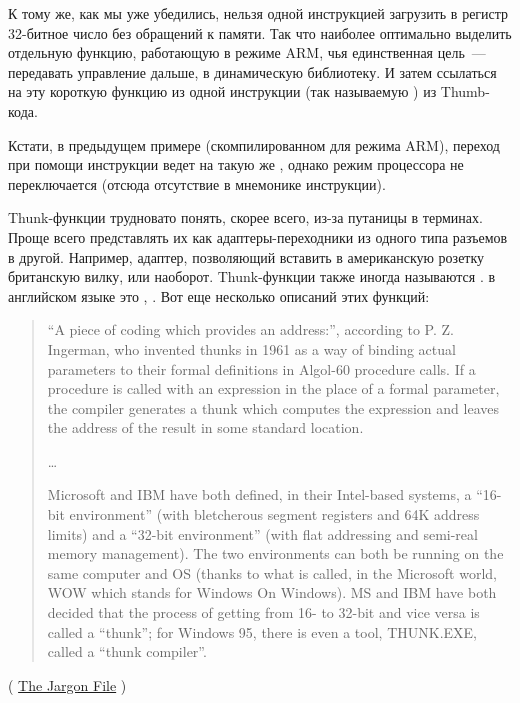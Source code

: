 К тому же, как мы уже убедились, нельзя одной инструкцией загрузить в регистр 32-битное число без обращений к памяти.
Так что наиболее оптимально выделить отдельную функцию, работающую в режиме ARM, 
чья единственная цель~--- передавать управление дальше, в динамическую библиотеку.
И затем ссылаться на эту короткую функцию из одной инструкции (так называемую ) из Thumb-кода.

Кстати, в предыдущем примере (скомпилированном для режима ARM), переход при помощи инструкции  ведет 
на такую же , однако режим процессора не переключается (отсюда отсутствие  в мнемонике инструкции).


Thunk-функции трудновато понять, скорее всего, из-за путаницы в терминах.
Проще всего представлять их как адаптеры-переходники из одного типа разъемов в другой.
Например, адаптер, позволяющий вставить в американскую розетку британскую вилку, или наоборот.
Thunk-функции также иногда называются .  в английском языке это , .
Вот еще несколько описаний этих функций:

\begin{framed}
\begin{quotation}
“A piece of coding which provides an address:”, according to P. Z. Ingerman, 
who invented thunks in 1961 as a way of binding actual parameters to their formal 
definitions in Algol-60 procedure calls. If a procedure is called with an expression 
in the place of a formal parameter, the compiler generates a thunk which computes 
the expression and leaves the address of the result in some standard location.

\dots

Microsoft and IBM have both defined, in their Intel-based systems, a “16-bit environment” 
(with bletcherous segment registers and 64K address limits) and a “32-bit environment” 
(with flat addressing and semi-real memory management). The two environments can both be 
running on the same computer and OS (thanks to what is called, in the Microsoft world, 
WOW which stands for Windows On Windows). MS and IBM have both decided that the process 
of getting from 16- to 32-bit and vice versa is called a “thunk”; for Windows 95, 
there is even a tool, THUNK.EXE, called a “thunk compiler”.
\end{quotation}
\end{framed}
( \href{http://go.yurichev.com/17362}{The Jargon File} )


